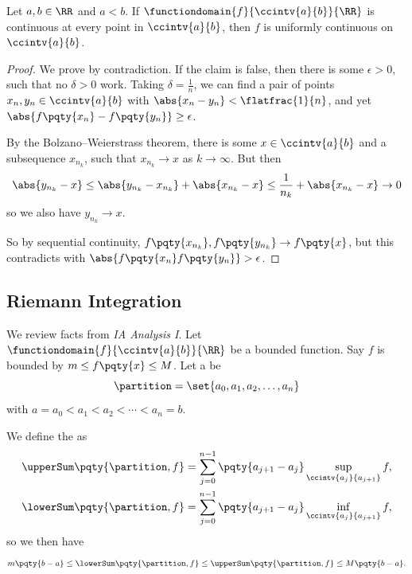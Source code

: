 \begin{theorem}
    \label{thm:continuity-implies-uniform-continuity}%
    Let \(a, b \in \RR\) and \(a < b\). If \(\functiondomain{f}{\ccintv{a}{b}}{\RR}\) is continuous at every point in \(\ccintv{a}{b}\), then \(f\) is uniformly continuous on \(\ccintv{a}{b}\).
\end{theorem}

\begin{proof}
    We prove by contradiction. If the claim is false, then there is some \(\epsilon > 0\), such that no \(\delta > 0\) work. Taking \(\delta = \frac{1}{n}\), we can find a pair of points \(x_n, y_n \in \ccintv{a}{b}\) with \(\abs{x_n - y_n} < \flatfrac{1}{n}\), and yet \(\abs{f\pqty{x_n} - f\pqty{y_n}} \geq \epsilon\).

    By the Bolzano--Weierstrass theorem, there is some \(x \in \ccintv{a}{b}\) and a subsequence \(x_{n_k}\), such that \(x_{n_k} \to x\) as \(k \to \infty\). But then
    \[
        \abs{y_{n_k} - x} \leq \abs{y_{n_k} - x_{n_k}} + \abs{x_{n_k} - x} \leq \frac{1}{n_k} + \abs{x_{n_k} - x} \to 0
    \]
    so we also have \(y_{n_k} \to x\).

    So by sequential continuity, \(f\pqty{x_{n_k}}, f\pqty{y_{n_k}} \to f\pqty{x}\), but this contradicts with \(\abs{f\pqty{x_n}  f\pqty{y_n}} > \epsilon\).
\end{proof}

\subsection{Riemann Integration}

We review facts from \textit{IA Analysis I}. Let \(\functiondomain{f}{\ccintv{a}{b}}{\RR}\) be a bounded function. Say \(f\) is bounded by \(m \leq f\pqty{x} \leq M\). Let a  be
\[
    \partition = \set{a_0, a_1, a_2, \ldots, a_n}
\]
with \(a = a_0 < a_1 < a_2 < \cdots < a_n = b\).

We define the  as
\begin{align*}
    \upperSum\pqty{\partition, f} &= \sum_{j = 0}^{n - 1} \pqty{a_{j + 1} - a_j}\sup_{\ccintv{a_j}{a_{j + 1}}} f, \\
    \lowerSum\pqty{\partition, f} &= \sum_{j = 0}^{n - 1} \pqty{a_{j + 1} - a_j}\inf_{\ccintv{a_j}{a_{j + 1}}} f,
\end{align*}
so we then have
\[
    m \pqty{b - a} \leq \lowerSum\pqty{\partition, f} \leq \upperSum\pqty{\partition, f} \leq M \pqty{b - a}.
\]

